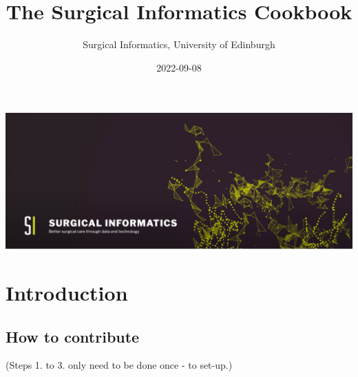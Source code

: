 \documentclass[
]{book}
\title{The Surgical Informatics Cookbook}
\author{Surgical Informatics, University of Edinburgh}
\date{2022-09-08}
\begin{document}
\maketitle

{
\setcounter{tocdepth}{1}
\tableofcontents
}
\hypertarget{section}{%
\chapter*{}\label{section}}

\includegraphics[width=30.97in]{img/surgical_informatics_minibanner}

\hypertarget{introduction}{%
\chapter{Introduction}\label{introduction}}

\hypertarget{how-to-contribute}{%
\section{How to contribute}\label{how-to-contribute}}

(Steps 1. to 3. only need to be done once - to set-up.)
\end{document}
